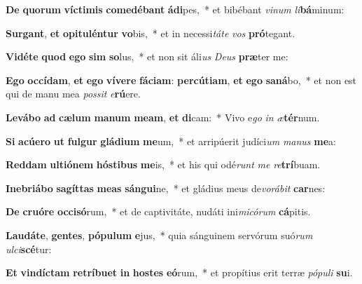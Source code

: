 \item \textbf{De} \textbf{quo}\textbf{rum} \textbf{víc}\textbf{ti}\textbf{mis} \textbf{com}\textbf{e}\textbf{dé}\textbf{bant} \textbf{á}\textbf{di}pes,~* et bibébant \textit{vi}\textit{num} \textit{li}\textbf{bá}minum:
\item \textbf{Sur}\textbf{gant}, \textbf{et} \textbf{o}\textbf{pi}\textbf{tu}\textbf{lén}\textbf{tur} \textbf{vo}bis,~* et in necessi\textit{tá}\textit{te} \textit{vos} \textbf{pró}tegant.
\item \textbf{Vi}\textbf{dé}\textbf{te} \textbf{quod} \textbf{e}\textbf{go} \textbf{sim} \textbf{so}lus,~* et non sit áli\textit{us} \textit{De}\textit{us} \textbf{præ}ter me:
\item \textbf{E}\textbf{go} \textbf{oc}\textbf{cí}\textbf{dam}, \textbf{et} \textbf{e}\textbf{go} \textbf{ví}\textbf{ve}\textbf{re} \textbf{fá}\textbf{ci}\textbf{am}: \textbf{per}\textbf{cú}\textbf{ti}\textbf{am}, \textbf{et} \textbf{e}\textbf{go} \textbf{sa}\textbf{ná}bo,~* et non est qui de manu mea \textit{pos}\textit{sit} \textit{e}\textbf{rú}ere.
\item \textbf{Le}\textbf{vá}\textbf{bo} \textbf{ad} \textbf{cæ}\textbf{lum} \textbf{ma}\textbf{num} \textbf{me}\textbf{am}, \textbf{et} \textbf{di}cam:~* Vivo e\textit{go} \textit{in} \textit{æ}\textbf{tér}num.
\item \textbf{Si} \textbf{a}\textbf{cú}\textbf{e}\textbf{ro} \textbf{ut} \textbf{ful}\textbf{gur} \textbf{glá}\textbf{di}\textbf{um} \textbf{me}um,~* et arripúerit judíci\textit{um} \textit{ma}\textit{nus} \textbf{me}a:
\item \textbf{Red}\textbf{dam} \textbf{ul}\textbf{ti}\textbf{ó}\textbf{nem} \textbf{hós}\textbf{ti}\textbf{bus} \textbf{me}is,~* et his qui odé\textit{runt} \textit{me} \textit{re}\textbf{trí}buam.
\item \textbf{In}\textbf{e}\textbf{bri}\textbf{á}\textbf{bo} \textbf{sa}\textbf{gít}\textbf{tas} \textbf{me}\textbf{as} \textbf{sán}\textbf{gui}ne,~* et gládius meus de\textit{vo}\textit{rá}\textit{bit} \textbf{car}nes:
\item \textbf{De} \textbf{cru}\textbf{ó}\textbf{re} \textbf{oc}\textbf{ci}\textbf{só}rum,~* et de captivitáte, nudáti ini\textit{mi}\textit{có}\textit{rum} \textbf{cá}pitis.
\item \textbf{Lau}\textbf{dá}\textbf{te}, \textbf{gen}\textbf{tes}, \textbf{pó}\textbf{pu}\textbf{lum} \textbf{e}jus,~* quia sánguinem servórum suó\textit{rum} \textit{ul}\textit{ci}\textbf{scé}tur:
\item \textbf{Et} \textbf{vin}\textbf{díc}\textbf{tam} \textbf{re}\textbf{trí}\textbf{bu}\textbf{et} \textbf{in} \textbf{hos}\textbf{tes} \textbf{e}\textbf{ó}rum,~* et propítius erit terræ \textit{pó}\textit{pu}\textit{li} \textbf{su}i.
